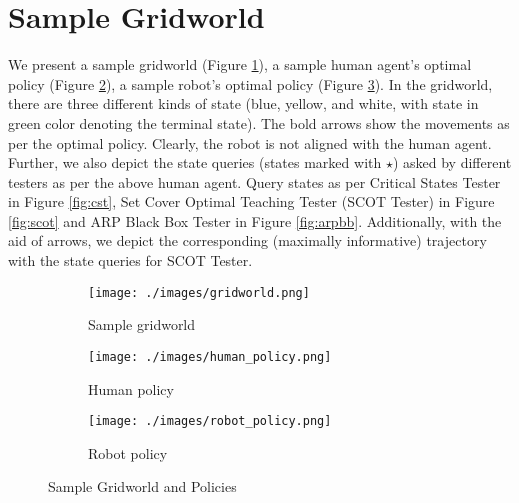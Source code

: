 \newpage
\section{Sample Gridworld}

We present a sample gridworld (Figure \ref{fig:gridworld}), a sample human agent's optimal policy (Figure \ref{fig:human_policy}), a sample robot's optimal policy (Figure \ref{fig:robot_policy}). In the gridworld, there are three different kinds of state (blue, yellow, and white, with state in green color denoting the terminal state). The bold arrows show the movements as per the optimal policy. Clearly, the robot is not aligned with the human agent. Further, we also depict the state queries (states marked with $\star$) asked by different testers as per the above human agent. Query states as per Critical States Tester in Figure \ref{fig:cst}, Set Cover Optimal Teaching Tester (SCOT Tester) in Figure \ref{fig:scot} and ARP Black Box Tester in Figure \ref{fig:arpbb}. Additionally, with the aid of arrows, we depict the corresponding (maximally informative) trajectory with the state queries for SCOT Tester.

\begin{figure}[hbtp]
     \centering
     \begin{subfigure}[hbtp]{0.3\textwidth}
         \centering
         \texttt{[image: ./images/gridworld.png]}
         \caption{Sample gridworld}
         \label{fig:gridworld}
     \end{subfigure}
    \hspace{5mm}
     \begin{subfigure}[hbtp]{0.3\textwidth}
         \centering
         \texttt{[image: ./images/human\_policy.png]}
         \caption{Human policy}
         \label{fig:human_policy}
     \end{subfigure}
    \hspace{5mm}
     \begin{subfigure}[hbtp]{0.3\textwidth}
         \centering
         \texttt{[image: ./images/robot\_policy.png]}
         \caption{Robot policy}
         \label{fig:robot_policy}
     \end{subfigure}
        \caption{Sample Gridworld and Policies}
        \label{fig:policies}
\end{figure}

